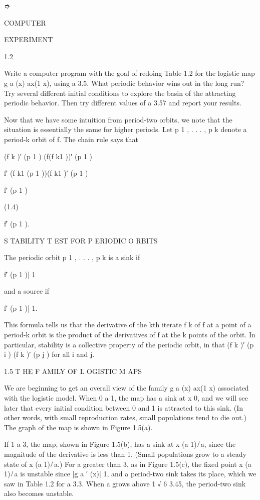 ➮

COMPUTER

EXPERIMENT

1.2

Write a computer program with the goal of redoing Table 1.2 for the logistic map g a (x)  ax(1  x), using a  
3.5. What periodic behavior wins out in the long run? Try several different initial conditions to explore 
the basin of the attracting periodic behavior. Then try different values of a  3.57 and report your 
results.

Now that we have some intuition from period-two orbits, we note that the situation is essentially the same 
for higher periods. Let p 1 , . . . , p k  denote a period-k orbit of f. The chain rule says that

(f k )′ (p 1 )  (f(f k1 ))′ (p 1 )

 f′ (f k1 (p 1 ))(f k1 )′ (p 1 )

 f′ (p 1 )

(1.4)

 f′ (p 1 ).

S TABILITY T EST FOR P ERIODIC O RBITS

The periodic orbit p 1 , . . . , p k  is a sink if

 f′ (p 1 )|  1

and a source if

 f′ (p 1 )| 
 1.


This formula tells us that the derivative of the kth iterate f k of f at a point of a period-k orbit is the 
product of the derivatives of f at the k points of the orbit. In particular, stability is a collective 
property of the periodic orbit, in that (f k )′ (p i )  (f k )′ (p j ) for all i and j.

1.5 T HE F AMILY OF L OGISTIC M APS

We are beginning to get an overall view of the family g a (x)  ax(1  x) associated with the logistic model. 
When 0 a  1, the map has a sink at x  0, and we will see later that every initial condition between 0 and 1 
is attracted to this sink. (In other words, with small reproduction rates, small populations tend to die 
out.) The graph of the map is shown in Figure 1.5(a).

If 1  a  3, the map, shown in Figure 1.5(b), has a sink at x  (a  1) ̸ a, since the magnitude of the 
derivative is less than 1. (Small populations grow to a steady state of x  (a  1) ̸ a.) For a greater than 
3, as in Figure 1.5(c), the ﬁxed point x  (a  1) ̸ a is unstable since |g a ′ (x)| 
 1, and a period-two sink takes its place, which we saw in Table 1.2 for a  3.3. When a grows above 1 √ 6  
3.45, the period-two sink also becomes unstable.

